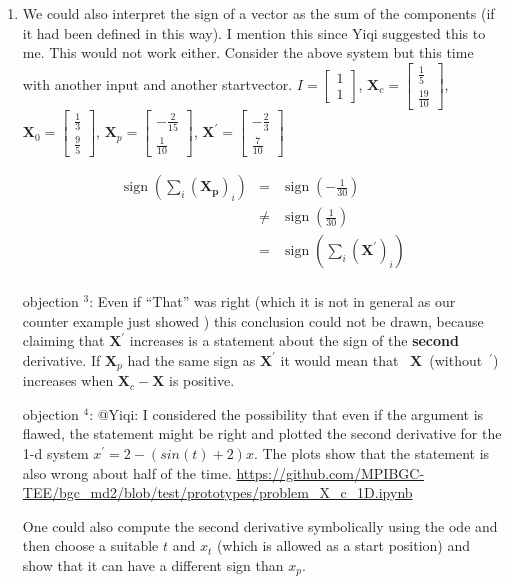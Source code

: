 \documentclass{article}
\newcommand{\om}[1]{{\color{red} objection $^{#1}$}: }
\newcommand{\X}{\mathbf{X}}
\begin{document}
\begin{enumerate}
    

  \item
    We could also interpret the sign of a vector as the sum of the components (if it had been defined in this way). I mention this since Yiqi suggested this to me.
    This would not work either. Consider the above system but this time with another input and another startvector.    
    $I=\left[\begin{matrix}1\\1\end{matrix}\right]$,
    $\X_c=\left[\begin{matrix}\frac{1}{5}\\\frac{19}{10}\end{matrix}\right]$,
    $\X_0=\left[\begin{matrix}\frac{1}{3}\\\frac{9}{5}\end{matrix}\right]$,
    $\X_p=\left[\begin{matrix}- \frac{2}{15}\\\frac{1}{10}\end{matrix}\right]$,
    $\X^\prime=\left[\begin{matrix}- \frac{2}{3}\\\frac{7}{10}\end{matrix}\right]$

    \begin{align*}
      \operatorname{sign}\left(
          \sum_i \left(\mathbf{X_p}\right)_i 
      \right) 
      &=& \operatorname{sign}\left(-\frac{1}{30}\right)
      \\
      &\ne& \operatorname{sign}\left(\frac{1}{30}\right)
      \\
      &=&\operatorname{sign}\left(
        \sum_i 
          \left(\mathbf{X}^{\prime} \right)_i
      \right)
    \end{align*}
    \\
    \om{3}
    Even if ``That'' was right (which it is not in general as our counter example just showed ) 
    this conclusion could not be drawn, 
    because claiming that $\X^{\prime}$ increases is a statement about the sign of the {\bf second} derivative.
    If $\X_p$ had the same sign as $\X^{\prime}$ it would mean that \mbox{ $\X$ (without $^{\prime}$)} increases when $\X_c-\X$ is positive.

    \om{4}
    @Yiqi: I considered the possibility that even if the argument is flawed, the 
    statement might be right and plotted the second derivative for the 1-d system $x^{\prime}=2-(sin(t)+2) x$. The plots show that the statement is also wrong about half of the time.
    \url{https://github.com/MPIBGC-TEE/bgc_md2/blob/test/prototypes/problem_X_c_1D.ipynb}

    One could also compute the second derivative symbolically using the ode and then choose a suitable $t$ and $x_t$ (which is allowed as a start position) and show that it can have a different sign than $x_p$. 

\end{enumerate}
\end{document}
